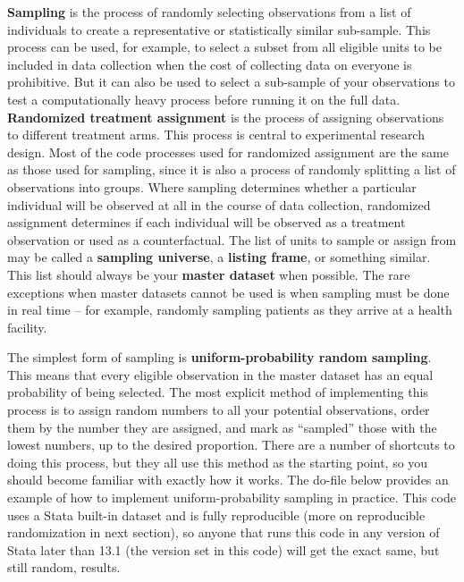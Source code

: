 \textbf{Sampling} is the process of randomly selecting observations
from a list of individuals to create a representative or statistically similar sub-sample.
This process can be used, for example, to select a subset from all eligible units
to be included in data collection when the cost of collecting data on everyone is prohibitive.
But it can also be used to select a sub-sample of your observations to test a computationally heavy process 
before running it on the full data.
\textbf{Randomized treatment assignment} is the process of assigning observations to different treatment arms.
This process is central to experimental research design.
Most of the code processes used for randomized assignment are the same as those used for sampling,
since it is also a process of randomly splitting a list of observations into groups.
Where sampling determines whether a particular individual
will be observed at all in the course of data collection,
randomized assignment determines if each individual will be observed
as a treatment observation or used as a counterfactual.
The list of units to sample or assign from may be called a \textbf{sampling universe},
a \textbf{listing frame}, or something similar.
This list should always be your \textbf{master dataset} when possible.
The rare exceptions when master datasets cannot be used is when sampling must be done in real time --
for example, randomly sampling patients as they arrive at a health facility.

The simplest form of sampling is 
\textbf{uniform-probability random sampling}.
This means that every eligible observation in the master dataset
has an equal probability of being selected.
The most explicit method of implementing this process
is to assign random numbers to all your potential observations,
order them by the number they are assigned,
and mark as ``sampled'' those with the lowest numbers, up to the desired proportion.
There are a number of shortcuts to doing this process,
but they all use this method as the starting point,
so you should become familiar with exactly how it works.
The do-file below provides an example of
how to implement uniform-probability sampling in practice.
This code uses a Stata built-in dataset and is fully reproducible
(more on reproducible randomization in next section),
so anyone that runs this code in any version of Stata later than 13.1
(the version set in this code)
will get the exact same, but still random, results.

